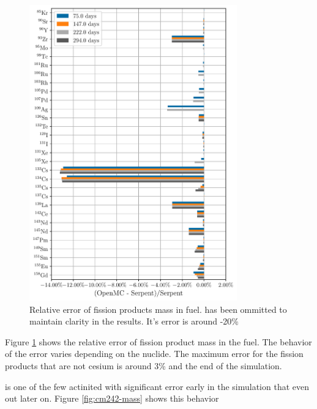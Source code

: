 \begin{figure}[htpb]
    \centering
    \includegraphics[width=0.8\textwidth]{figs/ch5/fission_products.pdf}
    \caption{Relative error of fission products mass in fuel. 
        has been ommitted to
        maintain clarity in the results. It's error is around -20\%
    }
    \label{fig:fission-products}
\end{figure}

Figure \ref{fig:fission-products} shows the relative error of fission product
mass in the fuel. The behavior of the error varies depending on the nuclide.
The maximum error for the fission products that are not cesium is around 3\%
and the end of the simulation.


 is one of the few actinited with significant error early in the
simulation that even out later on. Figure \ref{fig:cm242-mass} shows this
behavior

